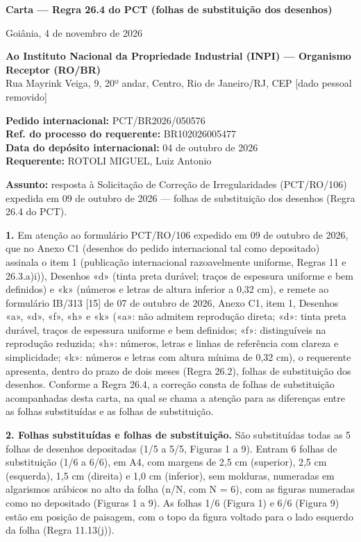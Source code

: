 \documentclass[a4paper,11pt]{article}
\begin{document}
\begin{center}{\large\bfseries Carta --- Regra 26.4 do PCT (folhas de substituição dos desenhos)}\end{center}

Goiânia, 4 de novembro de 2026

\textbf{Ao Instituto Nacional da Propriedade Industrial (INPI) --- Organismo Receptor (RO/BR)}\\ Rua Mayrink Veiga, 9, 20º andar, Centro, Rio de Janeiro/RJ, CEP [dado pessoal removido]

\textbf{Pedido internacional:} PCT/BR2026/050576\\ \textbf{Ref. do processo do requerente:} BR102026005477\\ \textbf{Data do depósito internacional:} 04 de outubro de 2026\\ \textbf{Requerente:} ROTOLI MIGUEL, Luiz Antonio

\textbf{Assunto:} resposta à Solicitação de Correção de Irregularidades (PCT/RO/106) expedida em 09 de outubro de 2026 --- folhas de substituição dos desenhos (Regra 26.4 do PCT).

\textbf{1.} Em atenção ao formulário PCT/RO/106 expedido em 09 de outubro de 2026, que no Anexo C1 (desenhos do pedido internacional tal como depositado) assinala o item 1 (publicação internacional razoavelmente uniforme, Regras 11 e 26.3.a)i)), Desenhos «d» (tinta preta durável; traços de espessura uniforme e bem definidos) e «k» (números e letras de altura inferior a 0,32 cm), e remete ao formulário IB/313 [15] de 07 de outubro de 2026, Anexo C1, item 1, Desenhos «a», «d», «f», «h» e «k» («a»: não admitem reprodução direta; «d»: tinta preta durável, traços de espessura uniforme e bem definidos; «f»: distinguíveis na reprodução reduzida; «h»: números, letras e linhas de referência com clareza e simplicidade; «k»: números e letras com altura mínima de 0,32 cm), o requerente apresenta, dentro do prazo de dois meses (Regra 26.2), folhas de substituição dos desenhos. Conforme a Regra 26.4, a correção consta de folhas de substituição acompanhadas desta carta, na qual se chama a atenção para as diferenças entre as folhas substituídas e as folhas de substituição.

\textbf{2. Folhas substituídas e folhas de substituição.} São substituídas todas as 5 folhas de desenhos depositadas (1/5 a 5/5, Figuras 1 a 9). Entram 6 folhas de substituição (1/6 a 6/6), em A4, com margens de 2,5 cm (superior), 2,5 cm (esquerda), 1,5 cm (direita) e 1,0 cm (inferior), sem molduras, numeradas em algarismos arábicos no alto da folha (n/N, com N = 6), com as figuras numeradas como no depositado (Figuras 1 a 9). As folhas 1/6 (Figura 1) e 6/6 (Figura 9) estão em posição de paisagem, com o topo da figura voltado para o lado esquerdo da folha (Regra 11.13(j)).
\end{document}
